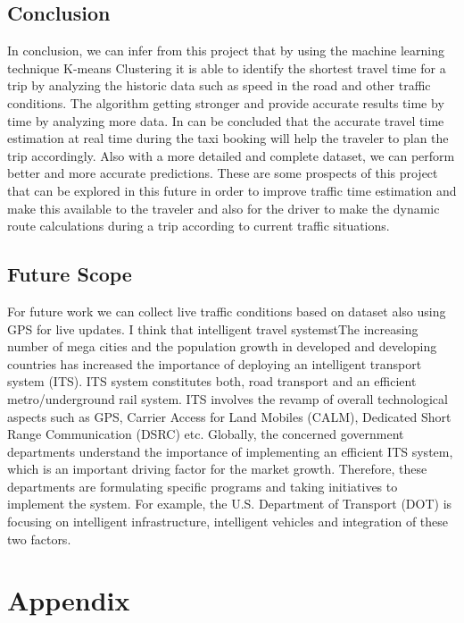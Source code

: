 \documentclass[12pt,report]{ucdavisthesis}
\begin{document}
         \section{Conclusion}
    \hspace{2cm}In conclusion, we can infer from this project that by using the machine learning
    technique K-means Clustering it is able to identify the shortest travel time for a trip
    by analyzing the historic data such as speed in the road and other traffic conditions.
    The algorithm getting stronger and provide accurate results time by time by
    analyzing more data. In can be concluded that the accurate travel time estimation at
    real time during the taxi booking will help the traveler to plan the trip accordingly.
    Also with a more detailed and complete dataset, we can perform better and more
    accurate predictions. These are some prospects of this project that can be explored
    in this future in order to improve traffic time estimation and make this available to
    the traveler and also for the driver to make the dynamic route calculations during a
    trip according to current traffic situations.
    \section{Future Scope}
    \hspace{2cm} For future work we can collect live traffic conditions based on dataset also using GPS for live updates. I think that intelligent travel systemstThe increasing number of mega cities and the population growth in developed and developing countries has increased the importance of deploying an intelligent transport system (ITS). ITS system constitutes both, road transport and an efficient metro/underground rail system. ITS involves the revamp of overall technological aspects such as GPS, Carrier Access for Land Mobiles (CALM), Dedicated Short Range Communication (DSRC) etc. Globally, the concerned government departments understand the importance of implementing an efficient ITS system, which is an important driving factor for the market growth. Therefore, these departments are formulating specific programs and taking initiatives to implement the system. For example, the U.S. Department of Transport (DOT) is focusing on intelligent infrastructure, intelligent vehicles and integration of these two factors.
   
    \chapter{Appendix}\label{chp:chapter}
    
\end{document}
